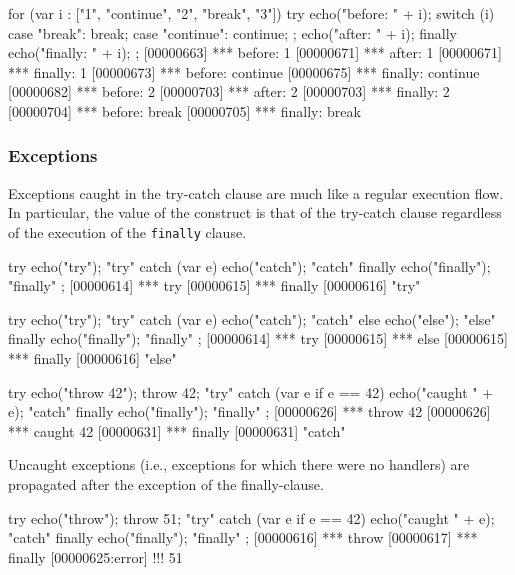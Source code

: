 \begin{urbiscript}
for (var i : ["1", "continue", "2", "break", "3"])
  try
  {
    echo("before:  " + i);
    switch (i)
    {
      case "break":    break;
      case "continue": continue;
    };
    echo("after:   " + i);
  }
  finally
  {
    echo("finally: " + i);
  };
[00000663] *** before:  1
[00000671] *** after:   1
[00000671] *** finally: 1
[00000673] *** before:  continue
[00000675] *** finally: continue
[00000682] *** before:  2
[00000703] *** after:   2
[00000703] *** finally: 2
[00000704] *** before:  break
[00000705] *** finally: break
\end{urbiscript}


\subsubsection{Exceptions}

Exceptions caught in the try-catch clause are much like a regular execution
flow.  In particular, the value of the construct is that of the try-catch
clause regardless of the execution of the \lstinline{finally} clause.

\begin{urbiscript}
try           { echo("try");     "try" }
catch (var e) { echo("catch");   "catch" }
finally       { echo("finally"); "finally" };
[00000614] *** try
[00000615] *** finally
[00000616] "try"

try           { echo("try");     "try" }
catch (var e) { echo("catch");   "catch" }
else          { echo("else");    "else" }
finally       { echo("finally"); "finally" };
[00000614] *** try
[00000615] *** else
[00000615] *** finally
[00000616] "else"

try                      { echo("throw 42"); throw 42; "try" }
catch (var e if e == 42) { echo("caught " + e);        "catch" }
finally                  { echo("finally");            "finally" };
[00000626] *** throw 42
[00000626] *** caught 42
[00000631] *** finally
[00000631] "catch"
\end{urbiscript}


Uncaught exceptions (i.e., exceptions for which there were no handlers) are
propagated after the exception of the finally-clause.

\begin{urbiscript}
try                      { echo("throw"); throw 51; "try" }
catch (var e if e == 42) { echo("caught " + e);     "catch" }
finally                  { echo("finally");         "finally" };
[00000616] *** throw
[00000617] *** finally
[00000625:error] !!! 51
\end{urbiscript}

